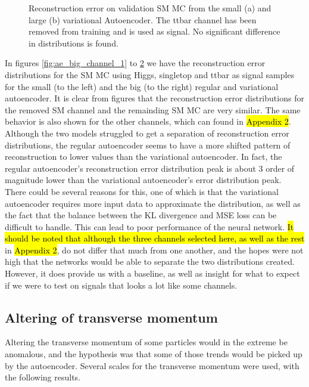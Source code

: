 \begin{figure}[H]
\begin{subfigure}{.45\textwidth}
        \caption{ }
        \label{fig:vae_big_ttbar}
    \end{subfigure}
    \hfill 
    \caption[VAE | Reconstruction error using ttbar channel as signal]{Reconstruction error on validation SM MC from the small (a) and large (b) variational Autoencoder. The ttbar channel has been removed from training and 
    is used as signal. No significant difference in distributions is found.  }
    \label{fig:vae_big_channel_3}
\end{figure}

In figures \ref{fig:ae_big_channel_1} to \ref{fig:vae_big_channel_3} we have the reconstruction error distributions for the SM MC using 
Higgs, singletop and ttbar as signal samples for the small (to the left) and the big (to the right) regular and variational autoencoder. 
It is clear from figures that the reconstruction error distributions for the removed SM channel and the remainding SM MC are very similar. 
The same behavior is also shown for the other channels, which can found in \hl{Appendix 2}. Although the two models struggled to get a 
separation of reconstruction error distributions, the regular autoencoder seems to have a more shifted pattern of reconstruction to lower 
values than the variational autoencoder. In fact, the regular autoencoder's reconstruction error distribution peak is about 3 order of 
magnitude lower than the variational autoencoder's error distribution peak. There could be several reasons for this, one of which is that 
the variational autoencoder requires more input data to approximate the distribution, as well as the fact that the balance between the KL divergence and MSE loss 
can be difficult to handle\cite{kl_mse_balance}. This can lead to poor performance of the neural network. \hl{It should be noted that although the 
three channels selected here, as well as the rest} in \hl{Appendix 2}, do not differ that much from one another, and the hopes were not high that 
the networks would be able to separate the two distributions created. However, it does provide us with a baseline, as well as insight for what 
to expect if we were to test on signals that looks a lot like some channels. 


\newpage


\subsection*{Altering of transverse momentum}
Altering the transverse momentum of some particles would in the extreme be anomalous, and the hypothesis was that some of those trends would be
picked up by the autoencoder. Several scales for the transverse momentum were used, with the following results.


